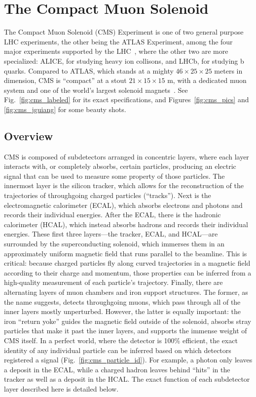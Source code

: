 \clearpage

\section{The Compact Muon Solenoid}
The Compact Muon Solenoid (CMS) Experiment is one of two general purpose LHC experiments, the other being the ATLAS\footnotemark{} Experiment, among the four major experiments supported by the LHC~\cite{LHCWeb}, where the other two are more specialized: ALICE, for studying heavy ion collisons, and LHCb, for studying b quarks. 
Compared to ATLAS, which stands at a mighty $46\times25\times25$ meters in dimension, CMS is ``compact'' at a stout $21\times15\times15$ m, with a dedicated muon system and one of the world's largest solenoid magnets~\cite{ATLASWeb, CMSWeb}. 
See Fig.~\ref{fig:cms_labeled} for its exact specifications, and Figures~\ref{fig:cms_pics} and \ref{fig:cms_jguiang} for some beauty shots. 

\subsection{Overview}
CMS is composed of subdetectors arranged in concentric layers, where each layer interacts with, or completely absorbs, certain particles, producing an electric signal that can be used to measure some property of those particles. 
The innermost layer is the silicon tracker, which allows for the reconstruction of the trajectories of throughgoing charged particles (``tracks''). 
Next is the electromagnetic calorimeter (ECAL), which absorbs electrons and photons and records their individual energies. 
After the ECAL, there is the hadronic calorimeter (HCAL), which instead absorbs hadrons and records their individual energies. 
These first three layers---the tracker, ECAL, and HCAL---are surrounded by the superconducting solenoid, which immerses them in an approximately uniform magnetic field that runs parallel to the beamline. 
This is critical: because charged particles fly along curved trajectories in a magnetic field according to their charge and momentum, those properties can be inferred from a high-quality measurement of each particle's trajectory. 
Finally, there are alternating layers of muon chambers and iron support structures. 
The former, as the name suggests, detects throughgoing muons, which pass through all of the inner layers mostly unperturbed.
However, the latter is equally important: the iron ``return yoke'' guides the magnetic field outside of the solenoid, absorbs stray particles that make it past the inner layers, and supports the immense weight of CMS itself. 
In a perfect world, where the detector is 100\% efficient, the exact identity of any individual particle can be inferred based on which detectors registered a signal (Fig.~\ref{fig:cms_particle_id}). 
For example, a photon only leaves a deposit in the ECAL, while a charged hadron leaves behind ``hits'' in the tracker as well as a deposit in the HCAL. 
The exact function of each subdetector layer described here is detailed below.

